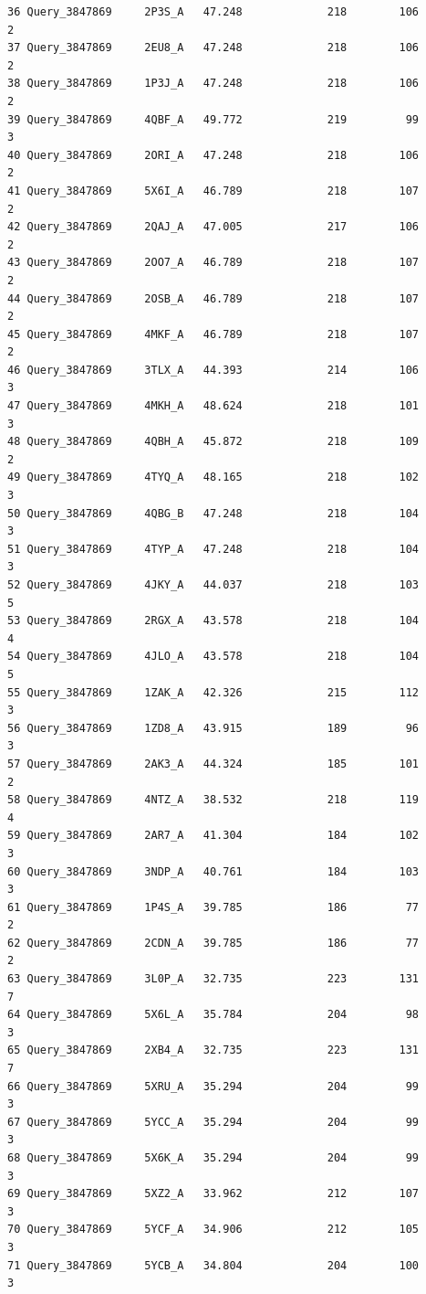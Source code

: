 \documentclass[
  letterpaper,
  DIV=11,
  numbers=noendperiod]{scrartcl}
\begin{document}
\begin{verbatim}
36 Query_3847869     2P3S_A   47.248             218        106        2
37 Query_3847869     2EU8_A   47.248             218        106        2
38 Query_3847869     1P3J_A   47.248             218        106        2
39 Query_3847869     4QBF_A   49.772             219         99        3
40 Query_3847869     2ORI_A   47.248             218        106        2
41 Query_3847869     5X6I_A   46.789             218        107        2
42 Query_3847869     2QAJ_A   47.005             217        106        2
43 Query_3847869     2OO7_A   46.789             218        107        2
44 Query_3847869     2OSB_A   46.789             218        107        2
45 Query_3847869     4MKF_A   46.789             218        107        2
46 Query_3847869     3TLX_A   44.393             214        106        3
47 Query_3847869     4MKH_A   48.624             218        101        3
48 Query_3847869     4QBH_A   45.872             218        109        2
49 Query_3847869     4TYQ_A   48.165             218        102        3
50 Query_3847869     4QBG_B   47.248             218        104        3
51 Query_3847869     4TYP_A   47.248             218        104        3
52 Query_3847869     4JKY_A   44.037             218        103        5
53 Query_3847869     2RGX_A   43.578             218        104        4
54 Query_3847869     4JLO_A   43.578             218        104        5
55 Query_3847869     1ZAK_A   42.326             215        112        3
56 Query_3847869     1ZD8_A   43.915             189         96        3
57 Query_3847869     2AK3_A   44.324             185        101        2
58 Query_3847869     4NTZ_A   38.532             218        119        4
59 Query_3847869     2AR7_A   41.304             184        102        3
60 Query_3847869     3NDP_A   40.761             184        103        3
61 Query_3847869     1P4S_A   39.785             186         77        2
62 Query_3847869     2CDN_A   39.785             186         77        2
63 Query_3847869     3L0P_A   32.735             223        131        7
64 Query_3847869     5X6L_A   35.784             204         98        3
65 Query_3847869     2XB4_A   32.735             223        131        7
66 Query_3847869     5XRU_A   35.294             204         99        3
67 Query_3847869     5YCC_A   35.294             204         99        3
68 Query_3847869     5X6K_A   35.294             204         99        3
69 Query_3847869     5XZ2_A   33.962             212        107        3
70 Query_3847869     5YCF_A   34.906             212        105        3
71 Query_3847869     5YCB_A   34.804             204        100        3

\end{verbatim}
\end{document}
